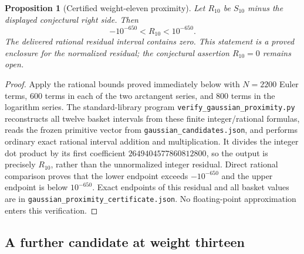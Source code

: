 \documentclass[11pt,letterpaper]{article}
\newtheorem{proposition}[theorem]{Proposition}
\theoremstyle{definition}
\theoremstyle{remark}
\begin{document}
\begin{proposition}[Certified weight-eleven proximity]\label{prop:S10-proximity}
Let $R_{10}$ be $S_{10}$ minus the displayed conjectural right side.
Then
\[
 -10^{-650}<R_{10}<10^{-650}.
\]
The delivered rational residual interval contains zero.  This statement
is a proved enclosure for the normalized residual; the conjectural
assertion $R_{10}=0$ remains open.
\end{proposition}
\begin{proof}
Apply the rational bounds proved immediately below with $N=2200$ Euler
terms, 600 terms in each of the two arctangent series, and 800 terms in
the logarithm series.  The standard-library program
\texttt{verify\_gaussian\_proximity.py} reconstructs all twelve basket
intervals from these finite integer/rational formulas, reads the frozen
primitive vector from \texttt{gaussian\_candidates.json}, and performs
ordinary exact rational interval addition and multiplication.  It
divides the integer dot product by its first coefficient
$2649404577860812800$, so the output is precisely $R_{10}$, rather than
the unnormalized integer residual.  Direct rational comparison proves
that the lower endpoint exceeds $-10^{-650}$ and the upper endpoint is
below $10^{-650}$.  Exact endpoints of this residual and all basket
values are in \texttt{gaussian\_proximity\_certificate.json}.
No floating-point approximation enters this verification.
\end{proof}

\subsection{A further candidate at weight thirteen}
\end{document}

